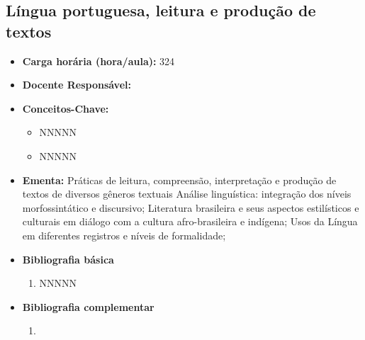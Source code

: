 \documentclass[11pt,fleqn]{book} %
\begin{document}
\subsection{Língua portuguesa, leitura e produção de textos}\label{disc:linguaportuguesa}
\begin{itemize}
	\item \textbf{Carga horária (hora/aula):} 324
	\item \textbf{Docente Responsável:}
	\item \textbf{Conceitos-Chave:}
	\begin{itemize}
		\item NNNNN
		\item NNNNN
	\end{itemize}
	\item \textbf{Ementa:} Práticas de leitura, compreensão, interpretação e produção de textos de diversos gêneros textuais
	Análise linguística: integração dos níveis morfossintático e discursivo;
	Literatura brasileira e seus aspectos estilísticos e culturais em diálogo com a cultura afro-brasileira e indígena;
	Usos da Língua em diferentes registros e níveis de formalidade;
	\item \textbf{Bibliografia básica}
	\begin{enumerate}
		\item NNNNN
	\end{enumerate}
	\item \textbf{Bibliografia complementar}
	\begin{enumerate}
		\item 
	\end{enumerate}	
\end{itemize}


\newpage
\end{document}
